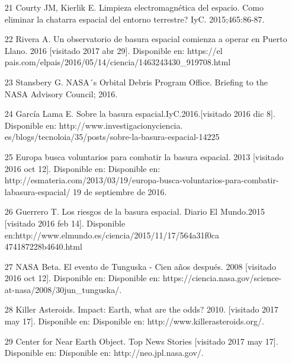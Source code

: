 \documentclass[12pt,letterpaper]{article}
\begin{document}
\begin{multicols}{2}
\begin{itemize}
    \item[21] {\scriptsize Courty JM, Kierlik E. Limpieza electromagnética del espacio. Como eliminar la chatarra espacial del entorno terrestre? IyC. 2015;465:86-87.}
    
    \item[22] {\scriptsize Rivera A. Un observatorio de basura espacial comienza a operar en Puerto Llano. 2016 [visitado 2017 abr 29]. Disponible en: https://el pais.com/elpais/2016/05/14/ciencia/1463243430_919708.html}
    
    \item[23]{\scriptsize Stansbery G. NASA´s Orbital Debris Program Office. Briefing to the NASA Advisory Council; 2016.}
    
    \item[24]{\scriptsize García Lama E. Sobre la basura espacial.IyC.2016.[visitado 2016 dic 8]. Disponible en: http://www.investigacionyciencia.
    es/blogs/tecnoloia/35/posts/sobre-la-basura-espacial-14225}
    
    \item[25]{\scriptsize Europa busca voluntarios para combatir la basura espacial. 2013 [visitado 2016 oct 12]. Disponible en: Disponible en: http://esmateria.com/2013/03/19/europa-busca-voluntarios-para-combatir-labasura-espacial/ 19 de septiembre de 2016.}
    
    \item[26]{\scriptsize Guerrero T. Los riesgos de la basura espacial. Diario El Mundo.2015 [visitado 2016 feb 14]. Disponible en:http://www.elmundo.es/ciencia/2015/11/17/564a31f0ca
    474187228b4640.html}
    
    \item[27]{\scriptsize NASA Beta. El evento de Tunguska - Cien años después. 2008 [visitado 2016 oct 12]. Disponible en: Disponible en:
    https://ciencia.nasa.gov/science-at-nasa/2008/30jun_tunguska/.}
    
    \item[28]{\scriptsize Killer Asteroids. Impact: Earth, what are the odds? 2010. [visitado 2017 may 17]. Disponible en: Disponible en: http://www.killerasteroids.org/.}
    
    \item[29]{\scriptsize Center for Near Earth Object. Top News Stories [visitado 2017 may 17]. Disponible en: Disponible en: http://neo.jpl.nasa.gov/.}
    

\end{itemize}
\end{multicols}
\end{document}

